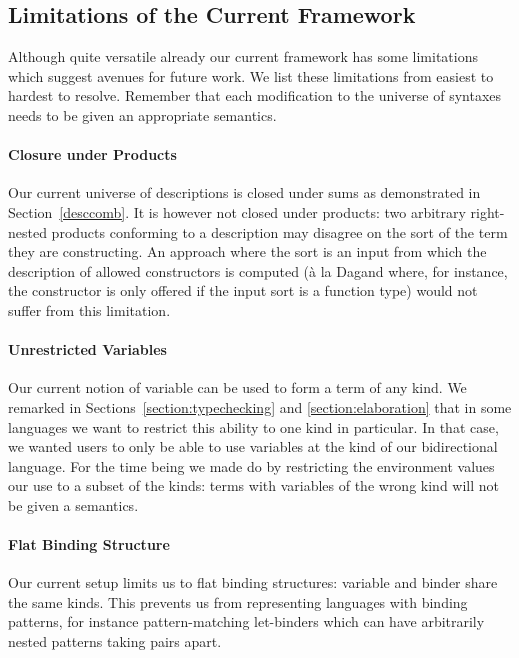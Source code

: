 {\subsection{Limitations of the Current Framework}

Although quite versatile already our current framework has some limitations
which suggest avenues for future work. We list these limitations from easiest
to hardest to resolve. Remember that each modification to the universe of
syntaxes needs to be given an appropriate semantics.

\paragraph{Closure under Products} Our current universe of descriptions is
closed under sums as demonstrated in Section~\ref{desccomb}. It is however
not closed under products: two arbitrary right-nested products conforming
to a description may disagree on the sort of the term they are constructing.
An approach where the sort is an input from which the description of allowed
constructors is computed (à la Dagand \citeyear{DBLP:phd/ethos/Dagand13} where,
for instance, the  constructor is only offered if the input sort is
a function type) would not suffer from this limitation.

\paragraph{Unrestricted Variables} Our current notion of variable can be used
to form a term of any kind. We remarked in Sections~\ref{section:typechecking}
and \ref{section:elaboration} that in some languages we want to restrict this
ability to one kind in particular. In that case, we wanted users to only be able
to use variables at the kind  of our bidirectional language. For the
time being we made do by restricting the environment values our 
use to a subset of the kinds: terms with variables of the wrong kind will not be
given a semantics.

\paragraph{Flat Binding Structure} Our current setup limits us to flat binding
structures: variable and binder share the same kinds. This prevents us from
representing languages with binding patterns, for instance pattern-matching
let-binders which can have arbitrarily nested patterns taking pairs apart.

}
